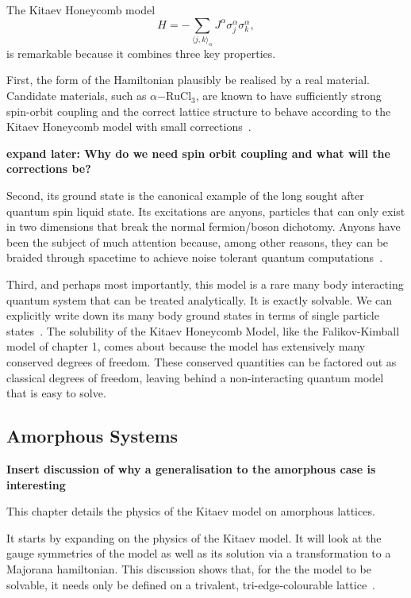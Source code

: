 The Kitaev Honeycomb model \[H =  - \sum_{\langle j,k\rangle_\alpha} J^{\alpha}\sigma_j^{\alpha}\sigma_k^{\alpha},\] is remarkable because it combines three key properties.

First, the form of the Hamiltonian plausibly be realised by a real material. Candidate materials, such as \(\alpha\mathrm{-RuCl}_3\), are known to have sufficiently strong spin-orbit coupling and the correct lattice structure to behave according to the Kitaev Honeycomb model with small corrections~\autocite{banerjeeProximateKitaevQuantum2016,trebstKitaevMaterials2022}.

\textbf{expand later: Why do we need spin orbit coupling and what will the corrections be?}

Second, its ground state is the canonical example of the long sought after quantum spin liquid state. Its excitations are anyons, particles that can only exist in two dimensions that break the normal fermion/boson dichotomy. Anyons have been the subject of much attention because, among other reasons, they can be braided through spacetime to achieve noise tolerant quantum computations~\autocite{freedmanTopologicalQuantumComputation2003}.

Third, and perhaps most importantly, this model is a rare many body interacting quantum system that can be treated analytically. It is exactly solvable. We can explicitly write down its many body ground states in terms of single particle states~\autocite{kitaevAnyonsExactlySolved2006}. The solubility of the Kitaev Honeycomb Model, like the Falikov-Kimball model of chapter 1, comes about because the model has extensively many conserved degrees of freedom. These conserved quantities can be factored out as classical degrees of freedom, leaving behind a non-interacting quantum model that is easy to solve.

\hypertarget{amorphous-systems}{%
\subsection{Amorphous Systems}\label{amorphous-systems}}

\textbf{Insert discussion of why a generalisation to the amorphous case is interesting}

This chapter details the physics of the Kitaev model on amorphous lattices.

It starts by expanding on the physics of the Kitaev model. It will look at the gauge symmetries of the model as well as its solution via a transformation to a Majorana hamiltonian. This discussion shows that, for the the model to be solvable, it needs only be defined on a trivalent, tri-edge-colourable lattice~\autocite{Nussinov2009}.

